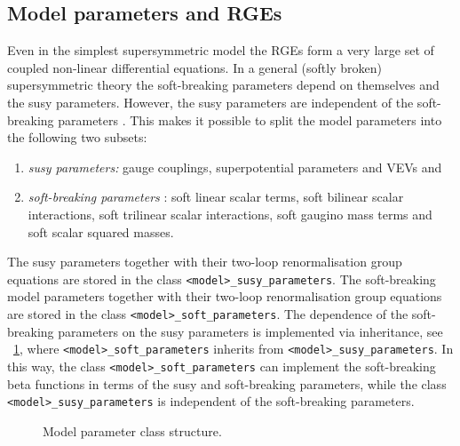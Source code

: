 \documentclass[final,3p,times,pdflatex]{elsarticle}
\newcommand{\code}[1]{\lstinline|#1|}  %
\begin{document}
\subsection{Model parameters and RGEs}
Even in the simplest supersymmetric model the RGEs form a very large
set of coupled non-linear differential equations.  In a general
(softly broken) supersymmetric theory the soft-breaking parameters
depend on themselves and the susy parameters.  However, the susy
parameters are independent of the soft-breaking parameters
\cite{Jones:1974pg,Jones:1983vk,West:1984dg,Martin:1993yx,Yamada:1993ga,MV94,Fonseca:2011vn,Sperling:2013eva,Sperling:2013xqa}.
This makes it possible to split the model parameters into the
following two subsets:
%
\begin{enumerate}
\item \emph{susy parameters:} gauge couplings, superpotential
  parameters and VEVs and
\item \emph{soft-breaking parameters} \cite{Girardello:1981wz}: soft
  linear scalar terms, soft bilinear scalar interactions, soft
  trilinear scalar interactions, soft gaugino mass terms and soft
  scalar squared masses.
\end{enumerate}
%
The susy parameters together with their two-loop renormalisation group
equations are stored in the class \code{<model>_susy_parameters}.  The
soft-breaking model parameters together with their two-loop
renormalisation group equations are stored in the class
\code{<model>_soft_parameters}.  The dependence of the soft-breaking
parameters on the susy parameters is implemented via inheritance, see
\figurename~\ref{fig:parameter-classes}, where
\code{<model>_soft_parameters} inherits from
\code{<model>_susy_parameters}.  In this way, the class
\code{<model>_soft_parameters} can implement the soft-breaking beta
functions in terms of the susy and soft-breaking parameters, while the
class \code{<model>_susy_parameters} is independent of the
soft-breaking parameters.
%
\begin{figure}
  \centering
  \caption{Model parameter class structure.}
  \label{fig:parameter-classes}
\end{figure}
\end{document}
